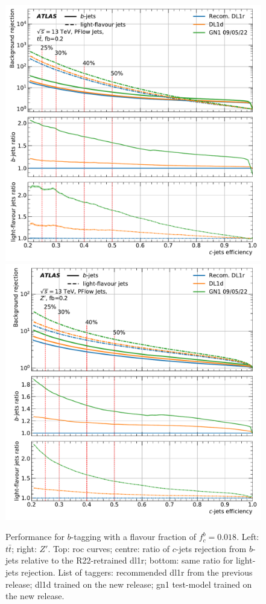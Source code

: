 \begin{center}
\begin{figure}[h!]
{}
\caption{Performance for $b$-tagging with a flavour fraction of $f^b_c = 0.018$. Left: $t\bar{t}$; right: $Z'$. Top: \gls{roc} curves; centre: ratio of $c$-jets rejection from $b$-jets relative to the R22-retrained \gls{dl1r}; bottom: same ratio for light-jets rejection. List of taggers: {\color{blue} recommended \gls{dl1r} from the previous release}; {\color{orange} \gls{dl1d} trained on the new release}; {\color{greenforest} \gls{gn1} test-model trained on the new release}.}
\label{fig:DL1dtt}
\bigskip
\centerline{
\includegraphics[scale=0.45]{Images/FTAG/Reprocessed/plotting_alone_c/ttbar_comparisons_299.pdf}
\includegraphics[scale=0.45]{Images/FTAG/Reprocessed/plotting_alone_c/zp_comparisons_299.pdf}
}
\end{figure}
\end{center}
